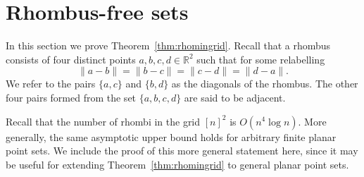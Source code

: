 \documentclass[11pt,oneside]{amsart}
\numberwithin{exercise}{subsection}
\begin{document}
\section{Rhombus-free sets}
\label{sec:rhombi}
In this section we prove Theorem~\ref{thm:rhomingrid}. Recall that a rhombus consists of four distinct points $a,b,c,d \in \mathbb R^2$ such that for some relabelling
\[
\|a-b\|=\|b-c\|=\|c-d\|=\|d-a\|.
\]
We refer to the pairs $\{a,c\}$ and $\{b,d\}$ as the diagonals of the rhombus. The other four pairs formed from the set $\{a,b,c,d\}$ are said to be adjacent.

Recall that the number of rhombi in the grid $[n]^2$ is $O(n^4 \log n)$. More generally, the same asymptotic upper bound holds for arbitrary finite planar point sets. We include the proof of this more general statement here, since it may be useful for extending Theorem~\ref{thm:rhomingrid} to general planar point sets. 
\end{document}
